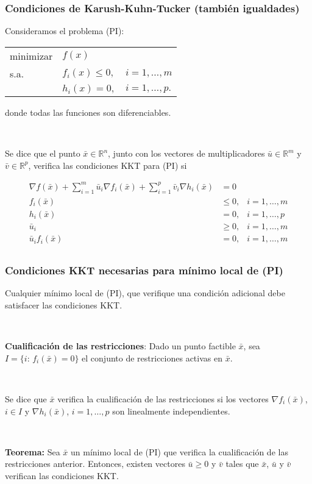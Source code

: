 \documentclass{beamer}
\begin{document}
\begin{frame}
\frametitle{Condiciones de Karush-Kuhn-Tucker (también igualdades)}

{\scriptsize
Consideramos el problema  (PI):

\begin{center}
\begin{tabular}{lll}
minimizar & $f(x)$ \\
s.a. & $f_i(x)\leq 0,$  &  $i=1,\ldots,m$ \\
	 & $h_i(x) = 0,$  &  $i=1,\ldots,p.$
\end{tabular}
\end{center}
donde todas las funciones son diferenciables.

\


Se dice que el punto $\bar{x}\in\mathbb{R}^n$, junto con los vectores de multiplicadores $\bar{u}\in\mathbb{R}^m$ y $\bar{v}\in\mathbb{R}^p$, verifica las condiciones KKT para (PI) si

\begin{align*}
\nabla f(\bar{x}) + \sum_{i=1}^m \bar{u}_i \nabla f_i(\bar{x}) + \sum_{i=1}^p \bar{v}_i\nabla h_i(\bar{x}) & = 0 \\
f_i(\bar{x}) &\leq 0, & i = 1,\ldots,m \\
h_i(\bar{x}) &= 0, & i = 1,\ldots,p \\
\bar{u}_i    & \geq 0, & i = 1,\ldots,m\\
\bar{u}_i f_i(\bar{x}) &  = 0, & i = 1,\ldots,m\\
\end{align*}

}










\end{frame}
\begin{frame}
\frametitle{Condiciones KKT necesarias para mínimo local de (PI)}



Cualquier mínimo local de (PI), que verifique una condición adicional debe satisfacer las condiciones   KKT.

\

\textbf{Cualificación de las restricciones}: Dado un punto factible $\bar{x}$, sea $I=\{i:\, f_i(\bar{x})=0\}$ el conjunto de restricciones activas en $\bar{x}$.

\

Se dice que $\bar{x}$ verifica la cualificación de las restricciones si  los vectores $\nabla f_i(\bar{x})$, $i\in I$ y $\nabla h_i(\bar{x})$, $i=1,\ldots,p$ son linealmente independientes.


\

\textbf{Teorema:} Sea $\bar{x}$ un mínimo local de (PI) que verifica la cualificación de las restricciones anterior. Entonces, existen vectores $\bar{u}\geq 0$ y $\bar{v}$ tales que $\bar{x}$, $\bar{u}$ y $\bar{v}$ verifican las condiciones KKT.

\end{frame}
\end{document}
